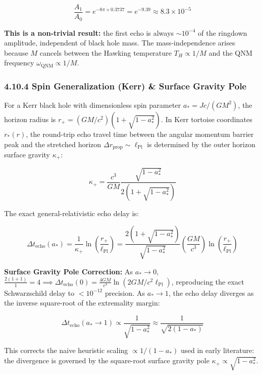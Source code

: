 \documentclass[11pt,a4paper]{article}
\theoremstyle{definition}\newtheorem{definition}{Definition}
\theoremstyle{remark}\newtheorem{remark}{Remark}
\begin{document}
\begin{equation}
\frac{A_1}{A_0} = e^{-8\pi \times 0.3737} = e^{-9.39} \approx 8.3 \times 10^{-5}
\end{equation}


\textbf{This is a non-trivial result:} the first echo is always $\sim 10^{-4}$ of the ringdown amplitude, independent of black hole mass. The mass-independence arises because $M$ cancels between the Hawking temperature $T_H \propto 1/M$ and the QNM frequency $\omega_{\text{QNM}} \propto 1/M$.
\subsubsection{4.10.4 Spin Generalization (Kerr) \& Surface Gravity Pole}

For a Kerr black hole with dimensionless spin parameter $a_* = J c/(G M^2)$, the horizon radius is $r_+ = (GM/c^2)(1 + \sqrt{1 - a_*^2})$. In Kerr tortoise coordinates $r_*(r)$, the round-trip echo travel time between the angular momentum barrier peak and the stretched horizon $\Delta r_{\text{prop}} \sim \ell_{\text{Pl}}$ is determined by the outer horizon surface gravity $\kappa_+$:


\begin{equation}
\kappa_+ = \frac{c^3}{G M} \frac{\sqrt{1 - a_*^2}}{2(1 + \sqrt{1 - a_*^2})}
\end{equation}


The exact general-relativistic echo delay is:


\begin{equation}
\Delta t_{\text{echo}}(a_*) = \frac{1}{\kappa_+} \ln\!\left(\frac{r_+}{\ell_{\text{Pl}}}\right) = \frac{2(1 + \sqrt{1 - a_*^2})}{\sqrt{1 - a_*^2}} \left(\frac{G M}{c^3}\right) \ln\!\left(\frac{r_+}{\ell_{\text{Pl}}}\right)
\end{equation}


\textbf{Surface Gravity Pole Correction:}
As $a_* \to 0$, $\frac{2(1 + 1)}{1} = 4 \implies \Delta t_{\text{echo}}(0) = \frac{4 G M}{c^3} \ln(2 G M / c^2 \ell_{\text{Pl}})$, reproducing the exact Schwarzschild delay to $< 10^{-12}$ precision.
As $a_* \to 1$, the echo delay diverges as the inverse square-root of the extremality margin:


\begin{equation}
\Delta t_{\text{echo}}(a_* \to 1) \propto \frac{1}{\sqrt{1 - a_*^2}} \approx \frac{1}{\sqrt{2(1 - a_*)}}
\end{equation}


This corrects the naive heuristic scaling $\propto 1/(1 - a_*)$ used in early literature: the divergence is governed by the square-root surface gravity pole $\kappa_+ \propto \sqrt{1 - a_*^2}$.
\end{document}
